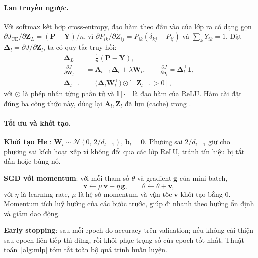 \paragraph{Lan truyền ngược.}
Với softmax kết hợp cross-entropy, đạo hàm theo đầu vào của lớp ra có dạng gọn $\partial J_{\text{CE}}/\partial\mathbf{Z}_L=(\mathbf{P}-\mathbf{Y})/n$, vì $\partial P_{ik}/\partial Z_{ij} = P_{ik}(\delta_{kj}-P_{ij})$ và $\sum_k Y_{ik}=1$. Đặt $\bm{\Delta}_l=\partial J/\partial\mathbf{Z}_l$, ta có quy tắc truy hồi:
\begin{align}
  \bm{\Delta}_L &= \tfrac{1}{n}(\mathbf{P}-\mathbf{Y}), \label{eq:dL}\\
  \frac{\partial J}{\partial \mathbf{W}_l} &= \mathbf{A}_{l-1}^{\top}\bm{\Delta}_l + \lambda\mathbf{W}_l,\qquad
  \frac{\partial J}{\partial \mathbf{b}_l} = \bm{\Delta}_l^{\top}\mathbf{1}, \label{eq:grad}\\
  \bm{\Delta}_{l-1} &= \big(\bm{\Delta}_l\mathbf{W}_l^{\top}\big)\odot \mathbb{I}[\mathbf{Z}_{l-1}>0], \label{eq:dprev}
\end{align}
với $\odot$ là phép nhân từng phần tử và $\mathbb{I}[\cdot]$ là đạo hàm của ReLU. Hàm  cài đặt đúng ba công thức này, dùng lại $\mathbf{A}_l,\mathbf{Z}_l$ đã lưu (cache) trong .

\paragraph{Tối ưu và khởi tạo.}
\textbf{Khởi tạo He} %
: $\mathbf{W}_l\sim\mathcal{N}(0,\,2/d_{l-1})$, $\mathbf{b}_l=\mathbf{0}$. Phương sai $2/d_{l-1}$ giữ cho phương sai kích hoạt xấp xỉ không đổi qua các lớp ReLU, tránh tín hiệu bị tắt dần hoặc bùng nổ.

\textbf{SGD với momentum}: với mỗi tham số $\theta$ và gradient $\mathbf{g}$ của mini-batch,
\begin{equation}
  \mathbf{v}\leftarrow \mu\,\mathbf{v}-\eta\,\mathbf{g},\qquad \theta\leftarrow\theta+\mathbf{v},
  \label{eq:momentum}
\end{equation}
với $\eta$ là learning rate, $\mu$ là hệ số momentum và vận tốc $\mathbf{v}$ khởi tạo bằng 0. Momentum tích luỹ hướng của các bước trước, giúp đi nhanh theo hướng ổn định và giảm dao động.

\textbf{Early stopping}: sau mỗi epoch đo accuracy trên validation; nếu không cải thiện sau  epoch liên tiếp thì dừng, rồi khôi phục trọng số của epoch tốt nhất. Thuật toán~\ref{alg:mlp} tóm tắt toàn bộ quá trình huấn luyện.

